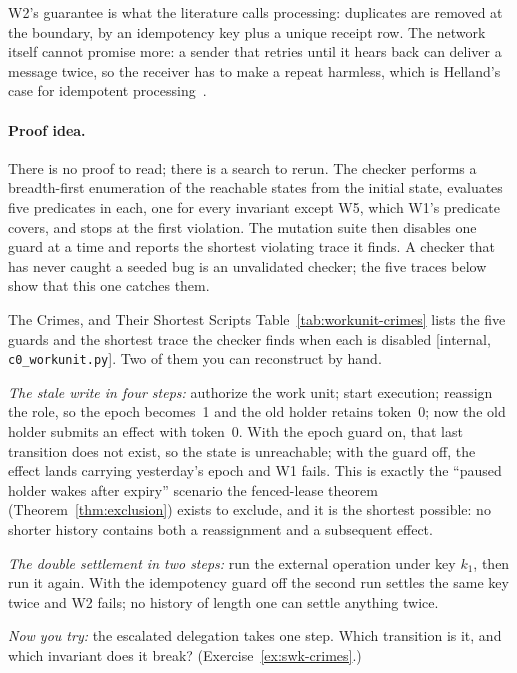 \documentclass[11pt,a4paper]{article}
\theoremstyle{definition}
\theoremstyle{remark}
\begin{document}

W2's guarantee is what the literature calls  processing:
duplicates are removed at the boundary, by an idempotency key plus a unique
receipt row. The network itself cannot promise more: a sender that retries until
it hears back can deliver a message twice, so the receiver has to make a repeat
harmless, which is Helland's case for idempotent processing~.

\paragraph{Proof idea.}
There is no proof to read; there is a search to rerun. The checker performs a breadth-first
enumeration of the reachable states from the initial state, evaluates five predicates in
each, one for every invariant except W5, which W1's predicate covers, and stops at the
first violation. The mutation suite then disables one guard at a
time and reports the shortest violating trace it finds. A checker that has never caught a
seeded bug is an unvalidated checker; the five traces below show that this one
catches them.

\begin{pdexample}{The Crimes, and Their Shortest Scripts}
\setlength{\parskip}{4pt plus 1pt}
Table~\ref{tab:workunit-crimes} lists the five guards and the shortest trace the checker
finds when each is disabled [internal, \texttt{c0\_workunit.py}]. Two of them you can
reconstruct by hand.

\emph{The stale write in four steps:} authorize the work unit; start
execution; reassign the role, so the epoch becomes~1 and the old holder retains token~0;
now the old holder submits an effect with token~0. With the epoch guard on, that last
transition does not exist, so the state is unreachable; with the guard off, the effect
lands carrying yesterday's epoch and W1 fails. This is exactly the ``paused holder wakes
after expiry'' scenario the fenced-lease theorem (Theorem~\ref{thm:exclusion}) exists to
exclude, and it is the shortest possible: no shorter history contains both a reassignment
and a subsequent effect.

\emph{The double settlement in two steps:} run the external
operation under key $k_1$, then run it again. With the idempotency guard off the second run
settles the same key twice and W2 fails; no history of length one can settle anything twice.

\emph{Now you try:} the escalated delegation takes one step. Which transition is it, and
which invariant does it break? (Exercise~\ref{ex:swk-crimes}.)
\end{pdexample}
\end{document}
